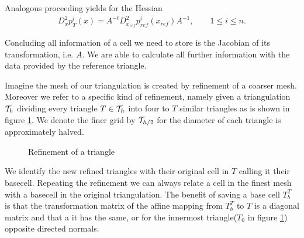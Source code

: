 \begin{example}
Analogous proceeding yields for the Hessian
\begin{align}
D_x^2p_T^i(x) = A^{-t} D_{x_{ref}}^2p^i_{ref}(x_{ref})  A^{-1}, \qquad 1 \leq i \leq n.
\end{align}

Concluding all information of a cell we need to store is the Jacobian of its transformation, i.e. $A$. We are able to calculate all further information with the data provided by the reference triangle.
\end{example}

Imagine the mesh of our triangulation is created by refinement of a coarser mesh. Moreover we refer to a specific kind of refinement, namely given a triangulation $\mathcal{T}_h$ dividing every triangle $T \in \mathcal{T}_h$ into four to $T$ similar triangles as is shown in figure \ref{pic: refinement}. We denote the finer grid by $\mathcal{T}_{h/2}$ for the diameter of each triangle is approximately halved.

\begin{figure}[h]

\caption{Refinement of a triangle}
 \label{pic: refinement}
\end{figure}

We identify the new refined triangles with their original cell in $T$ calling it their basecell. Repeating the refinement we can always relate a cell in the finest mesh with a basecell in the original triangulation.
The benefit of saving a base cell $T^T_b$ is that the transformation matrix of the affine mapping from $T^T_b$ to $T$ is a diagonal matrix and that a it has the same, or for the innermost triangle($T_0$ in figure \ref{pic: refinement}) opposite directed normals.

